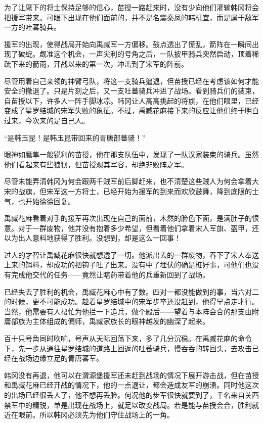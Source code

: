 为了让麾下的将士保持足够的信心，苗授一路赶来时，没有少向他们灌输韩冈将会把援军带来。可眼下出现在他们面前的，并不是名震秦凤的韩机宜，而是属于敌军一方的吐蕃骑兵。

援军的出现，使得战局开始向禹臧军一方偏移。鼓点透出了慌乱，箭阵在一瞬间出现了破绽。觑准这个机会，一声尖利的号角之后，一队披甲骑兵突然启动，顶着稀疏下来的箭雨，开战以来的第一次，冲击到了宋军的阵前。

尽管用着自己亲领的神臂弓队，将这一支骑兵逼退，但苗授已经在考虑该如何才能安全的撤退了。只是片刻之后，又一支吐蕃骑兵冲进了战场。看到骑兵们的装束，自苗授以下，许多人一阵手脚冰凉。韩冈让人高高挑起的将旗，在他们眼里，已经变成了星罗结城的宋军失败的象征。不过，禹臧花麻接下来的反应让他们终于明白过来，今次来的是自己人。

“是韩玉昆！是韩玉昆带回来的青唐部蕃骑！”

眼神如鹰隼一般锐利的苗授，他在那支队伍中，发现了一队汉家装束的骑兵。虽然他们看起来有些狼狈，但苗授观其军容，却绝非败阵之军。

尽管未能弄清韩冈为何会跟两千贼军前后脚赶来，也不清楚这些贼人为何会拿着大宋的战旗，但宋军这一方将士，已经开始为援军的到来而欢欣鼓舞，降到底限的士气，也开始徐徐回复。

禹臧花麻看着对手的援军再次出现在自己的面前，木然的脸色下面，是满肚子的恨意。对于一群废物，他并没有抱着多少希望，但看着他们拿着宋人军旗、盔甲，还以为出人意料地获得了胜利。没想到，却是这么一回事！

过人的才智让禹臧花麻很快就想透了一切。他派出去的一群废物，吞下了宋人奉送上来的饵料，却成功的把钩子吐了出来。没有中了埋伏的确是桩好事，可他们也没有完成他交代的任务——竟然让瞎药带着他的兵重新回到了战场。

已经失去了胜利的机会，禹臧花麻心中有了数。四对一都没能做到的事，当六对二的时候，更不可能成功。趁着星罗结城中的宋军步卒还没赶到，他得早点走才行。当然，他需要有人帮忙为他拦一下追兵，做个殿后——望着与本阵会合的那支由附庸部族为主体组成的偏师，禹臧家族长的眼神越发的幽深了起来。

百十只号角同时吹响，号声从天际回荡下来，多了几分沉稳。在禹臧花麻的命令下，先一步从通往星罗结城的道路上回返的吐蕃骑兵，慢吞吞的转回头，去攻击已经在战场边缘立足的青唐蕃军。

韩冈没有再退，他可以在渭源堡援军还未赶到战场的情况下展开游击战，但在苗授和禹臧花麻已经开战的情况下，他的一点退让，都会造成友军的崩溃。同时他这次的出场已经很丢人了，他不想再丢脸。何况他的步军很快就要到了，千名来自关西禁军中的精锐，单是出现在战场上，就足以改变战局。若是能与苗授会合，胜利就近在眼前。所以韩冈必须先为他们守住战场上的一角。

